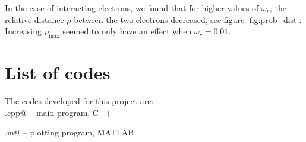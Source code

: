 \documentclass{article}
\begin{document}
\begin{multicols}{2}
In the case of interacting electrons, we found that for higher values of $\omega_r$, the relative distance $\rho$ between the two electrons decreased, see figure \ref{fig:prob_dist}.
Increasing $\rho_{\mathrm{max}}$ seemed to only have an effect when $\omega_r = 0.01$.





\section{List of codes}

The codes developed for this project are:\\

\noindent \verb@main.cpp@ -- main program, C++

\noindent \verb@plotting.m@ -- plotting program, MATLAB

\end{multicols}
\end{document}
